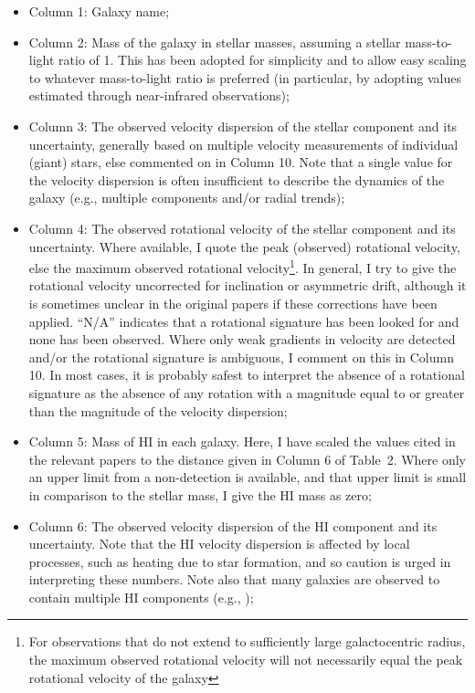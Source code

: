 \documentclass[manuscript]{aastex}
\begin{document}
\begin{itemize}

\item Column 1: Galaxy name;

\item Column 2: Mass of the galaxy in stellar masses, assuming a
  stellar mass-to-light ratio of 1. This has been adopted for
  simplicity and to allow easy scaling to whatever mass-to-light ratio
  is preferred (in particular, by adopting values estimated through
  near-infrared observations);

\item Column 3: The observed velocity dispersion of the stellar
  component and its uncertainty, generally based on multiple velocity
  measurements of individual (giant) stars, else commented on in
  Column 10. Note that a single value for the velocity dispersion is
  often insufficient to describe the dynamics of the galaxy (e.g.,
  multiple components and/or radial trends);

\item Column 4: The observed rotational velocity of the stellar
  component and its uncertainty. Where available, I quote the peak
  (observed) rotational velocity, else the maximum observed rotational
  velocity\footnote{For observations that do not extend to
    sufficiently large galactocentric radius, the maximum observed rotational
    velocity will not necessarily equal the peak rotational velocity
    of the galaxy}.  In general, I try to give the rotational velocity
  uncorrected for inclination or asymmetric drift, although it is
  sometimes unclear in the original papers if these corrections have
  been applied. ``N/A'' indicates that a rotational signature has been
  looked for and none has been observed. Where only weak gradients in
  velocity are detected and/or the rotational signature is ambiguous, I
  comment on this in Column 10. In most cases, it is probably safest
  to interpret the absence of a rotational signature as the absence of
  any rotation with a magnitude equal to or greater than the magnitude
  of the velocity dispersion;

\item Column 5: Mass of HI in each galaxy. Here, I have scaled the
  values cited in the relevant papers to the distance given in Column
  6 of Table~2. Where only an upper limit from a non-detection is
  available, and that upper limit is small in comparison to the
  stellar mass, I give the HI mass as zero;

\item Column 6: The observed velocity dispersion of the HI component
  and its uncertainty. Note that the HI velocity dispersion is
  affected by local processes, such as heating due to star formation,
  and so caution is urged in interpreting these numbers. Note also
  that many galaxies are observed to contain multiple HI components (e.g.,
\citealt{lo1993,young1996,young1997a,young1997b,young2003});


\end{itemize}
\end{document}
